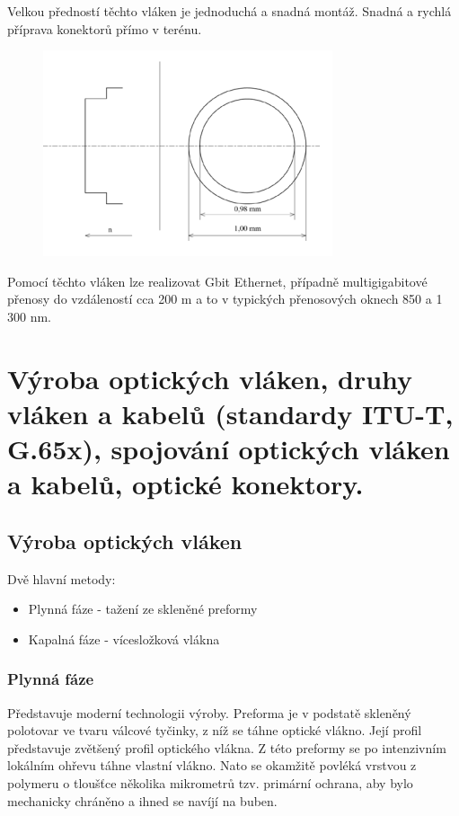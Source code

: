 Velkou předností těchto vláken je jednoduchá a snadná montáž. Snadná a rychlá příprava konektorů přímo v terénu.

\begin{figure}[!ht]
\begin{center}
    \includegraphics[scale=1]{obrazky/polym.png}
  \end{center}
\end{figure}

Pomocí těchto vláken lze realizovat Gbit Ethernet, případně multigigabitové přenosy do vzdáleností cca 200 m a to v typických přenosových oknech 850 a 1 300 nm.

\clearpage
\section{Výroba optických vláken, druhy vláken a kabelů (standardy ITU-T, G.65x), spojování optických vláken a kabelů, optické konektory.}

\subsection{Výroba optických vláken}
Dvě hlavní metody:
\begin{itemize}
    \item Plynná fáze - tažení ze skleněné preformy
    \item Kapalná fáze - vícesložková vlákna
\end{itemize}

\subsubsection{Plynná fáze}
Představuje moderní technologii výroby. Preforma je v podstatě skleněný polotovar ve tvaru válcové tyčinky, z níž se táhne optické vlákno. Její profil představuje zvětšený profil optického vlákna. Z této preformy se po intenzivním lokálním ohřevu táhne vlastní vlákno. Nato se okamžitě povléká vrstvou z polymeru o tloušťce několika mikrometrů tzv. primární ochrana, aby bylo mechanicky chráněno a ihned se navíjí na buben.

